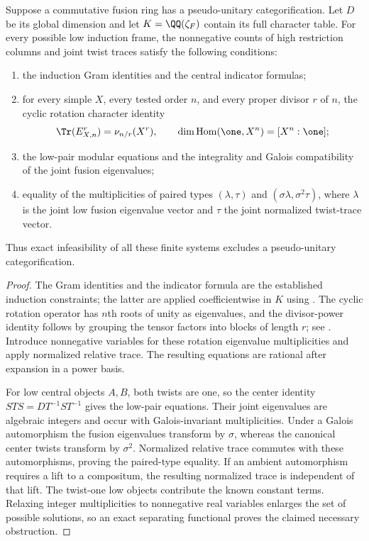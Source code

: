 \begin{proposition}
\label{prop:round3-full-character}
Suppose a commutative fusion ring has a pseudo-unitary categorification.
Let $D$ be its global dimension and let $K=\QQ(\zeta_F)$ contain its
full character table.  For every possible low induction frame, the
nonnegative counts of high restriction columns and joint twist traces
satisfy the following conditions:
\begin{enumerate}[label=\textup{(\roman*)}]
\item the induction Gram identities and the central indicator formulas;
\item for every simple $X$, every tested order $n$, and every proper
 divisor $r$ of $n$, the cyclic rotation character identity
\[
 \Tr(E_{X,n}^{r})=\nu_{n/r}(X^r),\qquad
 \dim\operatorname{Hom}(\one,X^n)=[X^n:\one];
\]
\item the low-pair modular equations and the integrality and Galois
 compatibility of the joint fusion eigenvalues;
\item equality of the multiplicities of paired types
 $(\lambda,\tau)$ and $(\sigma\lambda,\sigma^2\tau)$, where $\lambda$
 is the joint low fusion eigenvalue vector and $\tau$ the joint
 normalized twist-trace vector.
\end{enumerate}
Thus exact infeasibility of all these finite systems excludes a
pseudo-unitary categorification.
\end{proposition}
\begin{proof}
The Gram identities and the indicator formula are the established
induction constraints; the latter are applied coefficientwise in $K$
using \cite[Theorem~4.1]{NS}.  The cyclic rotation operator has $n$th
roots of unity as eigenvalues, and the divisor-power identity follows
by grouping the tensor factors into blocks of length $r$; see
\cite{NSpiv}.  Introduce nonnegative variables for these rotation
eigenvalue multiplicities and apply normalized relative trace.  The
resulting equations are rational after expansion in a power basis.

For low central objects $A,B$, both twists are one, so the center
identity $STS=DT^{-1}ST^{-1}$ gives the low-pair equations.
Their joint eigenvalues are algebraic integers and occur with
Galois-invariant multiplicities.  Under a Galois automorphism the
fusion eigenvalues transform by $\sigma$, whereas the canonical center
twists transform by $\sigma^2$.  Normalized relative trace commutes
with these automorphisms, proving the paired-type equality.  If an
ambient automorphism requires a lift to a compositum, the resulting
normalized trace is independent of that lift.  The twist-one low
objects contribute the known constant terms.  Relaxing integer
multiplicities to nonnegative real variables enlarges the set of
possible solutions, so an exact separating functional proves the
claimed necessary obstruction.
\end{proof}

